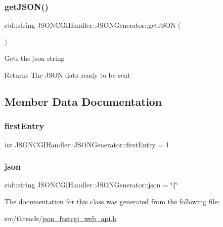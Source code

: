 \subsubsection{\texorpdfstring{get\+J\+S\+O\+N()}{getJSON()}}
{\footnotesize\ttfamily std\+::string J\+S\+O\+N\+C\+G\+I\+Handler\+::\+J\+S\+O\+N\+Generator\+::get\+J\+S\+ON (\begin{DoxyParamCaption}{ }\end{DoxyParamCaption})\hspace{0.3cm}{\ttfamily [inline]}}

Gets the json string \begin{DoxyReturn}{Returns}
The J\+S\+ON data ready to be sent 
\end{DoxyReturn}


\subsection{Member Data Documentation}
\mbox{\label{classJSONCGIHandler_1_1JSONGenerator_a9d14c80af92fa9f3a3406d826acd2cc0}} 
\subsubsection{\texorpdfstring{first\+Entry}{firstEntry}}
{\footnotesize\ttfamily int J\+S\+O\+N\+C\+G\+I\+Handler\+::\+J\+S\+O\+N\+Generator\+::first\+Entry = 1\hspace{0.3cm}{\ttfamily [private]}}

\mbox{\label{classJSONCGIHandler_1_1JSONGenerator_a5a9fd42e7b9030c6a0a4bee923a2e416}} 
\subsubsection{\texorpdfstring{json}{json}}
{\footnotesize\ttfamily std\+::string J\+S\+O\+N\+C\+G\+I\+Handler\+::\+J\+S\+O\+N\+Generator\+::json = \char`\"{}\{\char`\"{}\hspace{0.3cm}{\ttfamily [private]}}



The documentation for this class was generated from the following file\+:\begin{DoxyCompactItemize}
\item 
src/threads/\hyperlink{json__fastcgi__web__api_8h}{json\+\_\+fastcgi\+\_\+web\+\_\+api.\+h}\end{DoxyCompactItemize}

